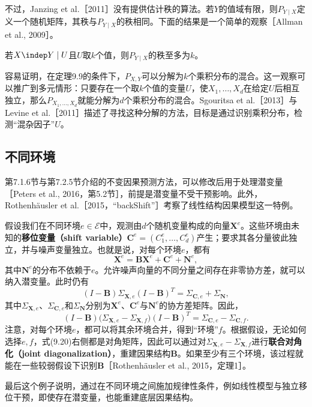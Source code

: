 不过，Janzing et al.［2011］没有提供估计秩的算法。若$Y$的值域有限，则$P_{Y\mid X}$定义一个随机矩阵，其秩与$P_{Y\mid X}$的秩相同。下面的结果是一个简单的观察［Allman et al., 2009］。
\begin{theorem}[秩与$U$的值域]
若$X\indep Y\mid U$且$U$取$k$个值，则$P_{Y\mid X}$的秩至多为$k$。
\end{theorem}

容易证明，在定理9.9的条件下，$P_{X,Y}$可以分解为$k$个乘积分布的混合。这一观察可以推广到多元情形：只要存在一个取$k$个值的变量$U$，使$X_1,\ldots,X_d$在给定$U$后相互独立，那么$P_{X_1,\ldots,X_d}$就能分解为$d$个乘积分布的混合。Sgouritsa et al.［2013］与Levine et al.［2011］描述了寻找这种分解的方法，目标是通过识别乘积分布，检测“混杂因子”$U$。
\FloatBarrier

\subsection{不同环境}
第7.1.6节与第7.2.5节介绍的不变因果预测方法，可以修改后用于处理潜变量［Peters et al., 2016，第5.2节］，前提是潜变量不受干预影响。此外，Rothenhäusler et al.［2015，“backShift”］考察了线性结构因果模型这一特例。

假设我们在不同环境$e\in\mathcal E$中，观测由$d$个随机变量构成的向量$\mathbf X^e$。这些环境由未知的\textbf{移位变量（shift variable）}$\mathbf C^e=(C_1^e,\ldots,C_d^e)$产生；要求其各分量彼此独立，并与噪声变量独立。也就是说，对每个环境$e$，都有
\[
 \mathbf X^e=\mathbf B\mathbf X^e+\mathbf C^e+\mathbf N^e,
\]
其中$\mathbf N^e$的分布不依赖于$e$。允许噪声向量的不同分量之间存在非零协方差，就可以纳入潜变量。此时仍有
\[
 (I-\mathbf B)\Sigma_{\mathbf X,e}(I-\mathbf B)^T
 =\Sigma_{\mathbf C,e}+\Sigma_{\mathbf N},
\]
其中$\Sigma_{\mathbf X,e}$、$\Sigma_{\mathbf C,e}$和$\Sigma_{\mathbf N}$分别为$\mathbf X^e$、$\mathbf C^e$与$\mathbf N^e$的协方差矩阵。因此，
\begin{equation}
 (I-\mathbf B)\bigl(\Sigma_{\mathbf X,e}-\Sigma_{\mathbf X,f}\bigr)(I-\mathbf B)^T
 =\Sigma_{\mathbf C,e}-\Sigma_{\mathbf C,f}.
 \tag{9.20}
\end{equation}
注意，对每个环境$e$，都可以将其余环境合并，得到“环境”$f$。根据假设，无论如何选择$e,f$，式(9.20)右侧都是对角矩阵，因此可以通过对$\Sigma_{\mathbf X,e}-\Sigma_{\mathbf X,f}$进行\textbf{联合对角化（joint diagonalization）}，重建因果结构$\mathbf B$。如果至少有三个环境，该过程就能在一些较弱假设下识别$\mathbf B$［Rothenhäusler et al., 2015，定理1］。

最后这个例子说明，通过在不同环境之间施加规律性条件，例如线性模型与独立移位干预，即使存在潜变量，也能重建底层因果结构。
\FloatBarrier
